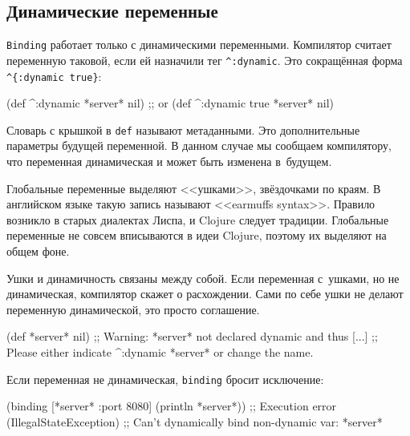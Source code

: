 \subsection{Динамические переменные}

\label{dynamic-vars}


\verb|Binding| работает только с динамическими переменными. Компилятор считает
переменную таковой, если ей назначили тег \verb|^:dynamic|. Это сокращённая
форма \verb|^{:dynamic true}|:

\begin{english}
  \begin{clojure}
(def ^:dynamic *server* nil)
;; or
(def ^{:dynamic true} *server* nil)
  \end{clojure}
\end{english}

Словарь с крышкой в \verb|def| называют метаданными. Это дополнительные
параметры будущей переменной. В данном случае мы сообщаем компилятору, что
переменная динамическая и может быть изменена в~будущем.

Глобальные переменные выделяют <<ушками>>, звёздочками по краям. В английском
языке такую запись называют <<earmuffs syntax>>. Правило возникло в старых
диалектах Лиспа, и Clojure следует традиции. Глобальные переменные не совсем
вписываются в идеи Clojure, поэтому их выделяют на общем фоне.


Ушки и динамичность связаны между собой. Если переменная с~ушками, но не
динамическая, компилятор скажет о расхождении. Сами по себе ушки не делают
переменную динамической, это просто соглашение.

\begin{english}
  \begin{clojure}
(def *server* nil)
;; Warning: *server* not declared dynamic and thus [...]
;; Please either indicate ^:dynamic *server* or change the name.
  \end{clojure}
\end{english}

\noindent
Если переменная не динамическая, \verb|binding| бросит исключение:

\begin{english}
  \begin{clojure}
(binding [*server* {:port 8080}]
  (println *server*))
;; Execution error (IllegalStateException)
;; Can't dynamically bind non-dynamic var: *server*
  \end{clojure}
\end{english}

